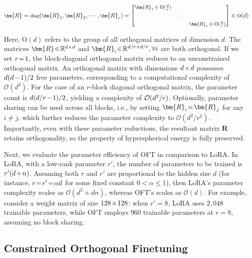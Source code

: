 \begin{equation}
    \footnotesize
    \bm{R}=\text{diag}(\bm{R}_1,\bm{R}_2,\cdots,\bm{R}_r)=\begin{bmatrix}
    \bm{R}_1\in \text{O}(\frac{d}{r}) &  &\\
    &\ddots & \\
    & & \bm{R}_r\in \text{O}(\frac{d}{r})
    \end{bmatrix}\in \text{O}(d)
\end{equation}

Here, $\text{O}(d)$ refers to the group of all orthogonal matrices of dimension $d$. The matrices $\thickmuskip=2mu \medmuskip=2mu \bm{R}\in\mathbb{R}^{d\times d}$ and $\thickmuskip=2mu \medmuskip=2mu \bm{R}_i\in\mathbb{R}^{d/r\times d/r},\forall i$ are both orthogonal. If we set $\thickmuskip=2mu \medmuskip=2mu r=1$, the block-diagonal orthogonal matrix reduces to an unconstrained orthogonal matrix. An orthogonal matrix with dimensions $\thickmuskip=2mu \medmuskip=2mu d\times d$ possesses $\thickmuskip=2mu \medmuskip=2mu d(d-1)/2$ free parameters, corresponding to a computational complexity of $\mathcal{O}(d^2)$. For the case of an $r$-block diagonal orthogonal matrix, the parameter count is $\thickmuskip=2mu \medmuskip=2mu d(d/r-1)/2$, yielding a complexity of $\thickmuskip=2mu \medmuskip=2mu \mathcal{O}(d^2/r)$. Optionally, parameter sharing can be used across all blocks, i.e., by setting $\thickmuskip=2mu \medmuskip=2mu \bm{R}_i = \bm{R}_j$ for any $i\neq j$, which further reduces the parameter complexity to $\mathcal{O}(d^2/r^2)$. Importantly, even with these parameter reductions, the resultant matrix $\bm{R}$ retains orthogonality, so the property of hyperspherical energy is fully preserved.

Next, we evaluate the parameter efficiency of OFT in comparison to LoRA. In LoRA, with a low-rank parameter $r'$, the number of parameters to be trained is $\thickmuskip=2mu \medmuskip=2mu r'(d+n)$. Assuming both $r$ and $r'$ are proportional to the hidden size $d$ (for instance, $\thickmuskip=2mu \medmuskip=2mu r=r'=\alpha d$ for some fixed constant $0<\alpha\leq 1$), then LoRA's parameter complexity scales as $\mathcal{O}(d^2+dn)$, whereas OFT’s scales as $\mathcal{O}(d)$. For example, consider a weight matrix of size $\thickmuskip=2mu \medmuskip=2mu 128\times 128$: when $r'=8$, LoRA uses $2,048$ trainable parameters, while OFT employs $960$ trainable parameters at $r=8$, assuming no block sharing.

\subsection{Constrained Orthogonal Finetuning}

